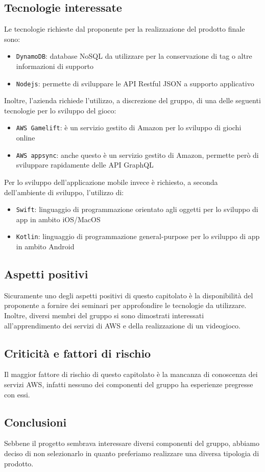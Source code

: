 \subsection{Tecnologie interessate}
Le tecnologie richieste dal proponente per la realizzazione del prodotto finale sono:
\begin{itemize}
	\item \verb|DynamoDB|: database NoSQL da utilizzare per la conservazione di tag o altre informazioni di supporto
	\item \verb|Nodejs|: permette di sviluppare le API Restful JSON a supporto applicativo
\end{itemize}
Inoltre, l'azienda richiede l'utilizzo, a discrezione del gruppo, di una delle seguenti tecnologie per lo sviluppo del gioco:
\begin{itemize}
	\item \verb|AWS Gamelift|: è un servizio gestito di Amazon per lo sviluppo di giochi online
	\item \verb|AWS appsync|: anche questo è un servizio gestito di Amazon, permette però di sviluppare rapidamente delle API GraphQL
\end{itemize}
Per lo sviluppo dell'applicazione mobile invece è richiesto, a seconda dell'ambiente di sviluppo, l'utilizzo di:
\begin{itemize}
	\item \verb|Swift|: linguaggio di programmazione orientato agli oggetti per lo sviluppo di app in ambito iOS/MacOS
	\item \verb|Kotlin|: linguaggio di programmazione general-purpose per lo sviluppo di app in ambito Android
\end{itemize}


\subsection{Aspetti positivi}
Sicuramente uno degli aspetti positivi di questo capitolato è la disponibilità del proponente a fornire dei seminari per approfondire le tecnologie da utilizzare.
Inoltre, diversi membri del gruppo si sono dimostrati interessati all'apprendimento dei servizi di AWS e della realizzazione di un videogioco.


\subsection{Criticità e fattori di rischio}
Il maggior fattore di rischio di questo capitolato è la mancanza di conoscenza dei servizi AWS, infatti nessuno dei componenti del gruppo ha esperienze pregresse con essi.


\subsection{Conclusioni}
Sebbene il progetto sembrava interessare diversi componenti del gruppo, abbiamo deciso di non selezionarlo in quanto preferiamo realizzare una diversa tipologia di prodotto.
\newpage
